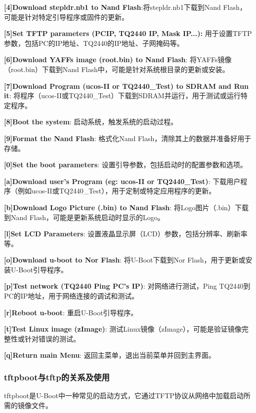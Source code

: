     \textbf{[4]Download stepldr.nb1 to Nand Flash}:将stepldr.nb1下载到Nand Flash，可能是针对特定引导程序或固件的更新。
    
    \textbf{[5]Set TFTP parameters (PCIP, TQ2440 IP, Mask IP...):} 用于设置TFTP参数，包括PC的IP地址、TQ2440的IP地址、子网掩码等。
    
    \textbf{[6]Download YAFFs image (root.bin) to Nand Flash}: 将YAFFs镜像（root.bin）下载到Nand Flash中，可能是针对系统根目录的更新或安装。
    
    \textbf{[7]Download Program (ucos-II or TQ2440_Test) to SDRAM and Run it}: 将程序（ucos-II或TQ2440_Test）下载到SDRAM并运行，用于测试或运行特定程序。
    
    \textbf{[8]Boot the system}: 启动系统，触发系统的启动过程。
    
    \textbf{[9]Format the Nand Flash}: 格式化Nand Flash，清除其上的数据并准备好用于存储。
    
    \textbf{[0]Set the boot parameters}: 设置引导参数，包括启动时的配置参数和选项。
    
    \textbf{[a]Download user's Program (eg: ucos-II or TQ2440_Test)}: 下载用户程序（例如ucos-II或TQ2440_Test），用于定制或特定应用程序的更新。
    
   \textbf{[b]Download Logo Picture (.bin) to Nand Flash}: 将Logo图片（.bin）下载到Nand Flash，可能是更新系统启动时显示的Logo。
    
    \textbf{[l]Set LCD Parameters}: 设置液晶显示屏（LCD）参数，包括分辨率、刷新率等。
    
    \textbf{[o]Download u-boot to Nor Flash}: 将U-Boot下载到Nor Flash，用于更新或安装U-Boot引导程序。
    
    \textbf{[p]Test network (TQ2440 Ping PC's IP)}: 对网络进行测试，Ping TQ2440到PC的IP地址，用于网络连接的调试和测试。
    
    \textbf{[r]Reboot u-boot}: 重启U-Boot引导程序。
    
    \textbf{[t]Test Linux image (zImage)}: 测试Linux镜像（zImage），可能是验证镜像完整性或针对错误的测试。
    
    \textbf{[q]Return main Menu}: 返回主菜单，退出当前菜单并回到主界面。
    
\subsubsection{tftpboot与tftp的关系及使用}

    tftpboot是U-Boot中一种常见的启动方式，它通过TFTP协议从网络中加载启动所需的镜像文件。
    
